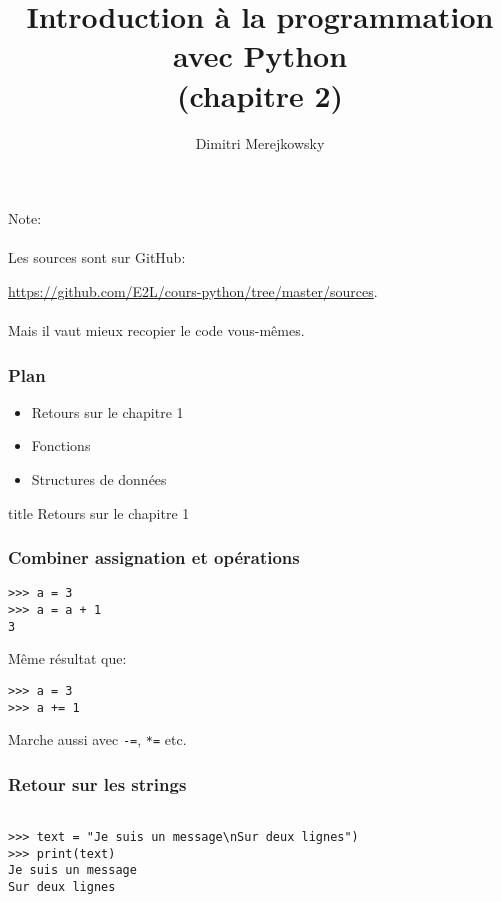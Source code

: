 \documentclass{beamer}
\title{Introduction à la programmation avec Python \\ (chapitre 2)}
\author{Dimitri Merejkowsky}
\institute{E2L}
\begin{document}
\frame{\titlepage}

\begin{frame}

Note: \\~\\

Les sources sont sur GitHub:

\url{https://github.com/E2L/cours-python/tree/master/sources}. \\~\\


Mais il vaut mieux recopier le code vous-mêmes.

\end{frame}


\begin{frame}

\frametitle{Plan}

\begin{itemize}
  \item Retours sur le chapitre 1
  \item Fonctions
  \item Structures de données
\end{itemize}

\end{frame}


\begin{frame}[fragile]
  \centering
  \begin{beamercolorbox}[sep=8pt,center,shadow=true,rounded=true]{title}
    Retours sur le chapitre 1
  \end{beamercolorbox}
\end{frame}


\begin{frame}[fragile]
  \frametitle{Combiner assignation et opérations}

\begin{lstlisting}
>>> a = 3
>>> a = a + 1
3
\end{lstlisting}

Même résultat que:

\begin{lstlisting}
>>> a = 3
>>> a += 1
\end{lstlisting}

\vfill

Marche aussi avec \texttt{-=}, \texttt{*=} etc.

\end{frame}

\begin{frame}[fragile]
  \frametitle{Retour sur les strings}

\begin{lstlisting}

>>> text = "Je suis un message\nSur deux lignes")
>>> print(text)
Je suis un message
Sur deux lignes
\end{lstlisting}

\end{frame}
\end{document}
